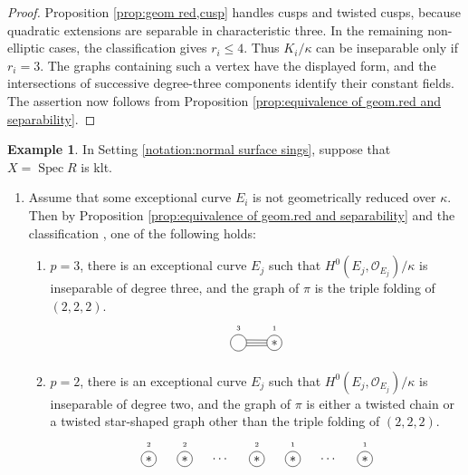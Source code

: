 \documentclass[12pt]{amsart}
\def\le{\leqslant}
\def\Spec{\operatorname{Spec}}
\newcommand{\sO}{\mathcal{O}}
\theoremstyle{plain}
\theoremstyle{definition}
\newtheorem{eg}[thm]{Example}
\theoremstyle{remark}
\newtheorem{defn and notation}[thm]{Definition and Notation}
\theoremstyle{plain}
\numberwithin{equation}{thm}
\begin{document}
\begin{proof}
Proposition \ref{prop:geom red,cusp} handles cusps and twisted cusps, because quadratic extensions are separable in characteristic three.
In the remaining non-elliptic cases, the classification gives $r_i\le4$.
Thus $K_i/\kappa$ can be inseparable only if $r_i=3$.
The graphs containing such a vertex have the displayed form, and the intersections of successive degree-three components identify their constant fields.
The assertion now follows from Proposition \ref{prop:equivalence of geom.red and separability}.
\end{proof}

\begin{eg}\label{eg:geom reducedness of exc div2}
    In Setting \ref{notation:normal surface sings}, suppose that $X=\Spec R$ is klt.
    \begin{enumerate}[label=\textup{(\arabic*)}]
    \item Assume that some exceptional curve $E_i$ is not geometrically reduced over $\kappa$.
    Then by Proposition \ref{prop:equivalence of geom.red and separability} and the classification \cite[Figure 1]{Sato23}, one of the following holds:
    \begin{enumerate}[label=\textup{(\alph*)}]
    \item $p=3$, there is an exceptional curve $E_j$ such that $H^0(E_j, \sO_{E_j})/\kappa$ is inseparable of degree three, and the graph of $\pi$ is the triple folding of $(2,2,2)$. 
    \[
    \begin{tikzpicture}
    \node[draw, shape=circle, inner sep=4.5pt] (B1) at (0,-1){};
    \draw[shift={(0,0.4)}] (0,-1) node{\tiny $3$};
    \node[draw, shape=circle, inner sep=1.8pt] (B2) at (1,-1){$*$};
    \draw[shift={(0,0.4)}] (1,-1) node{\tiny $1$};

    \draw (B1.20)--(B2.160);
    \draw (B1)--(B2);
    \draw (B1.-20)--(B2.200);
    \end{tikzpicture}
    \]
        
    \item $p=2$, there is an exceptional curve $E_j$ such that $H^0(E_j, \sO_{E_j})/\kappa$ is inseparable of degree two, and the graph of $\pi$ is either a twisted chain or a twisted star-shaped graph other than the triple folding of $(2,2,2)$.
    \[
\begin{tikzpicture}
\node[draw, shape=circle, inner sep=1.8pt] (A1) at (0,0){$*$};
\draw[shift={(0,0.4)}] (0,0) node{\tiny $2$};
\node[draw, shape=circle, inner sep=1.8pt] (A2) at (1,0){$*$};
\draw[shift={(0,0.4)}] (1,0) node{\tiny $2$};
\draw node (ADot) at (2,0){$\cdots$};
\node[draw, shape=circle, inner sep=1.8pt] (A3) at (3,0){$*$};
\draw[shift={(0,0.4)}] (3,0) node{\tiny $2$};
\node[draw, shape=circle, inner sep=1.8pt] (A4) at (4,0){$*$};
\draw[shift={(0,0.4)}] (4,0) node{\tiny $1$};
\draw node (ADot2) at (5,0){$\cdots$};
\node[draw, shape=circle, inner sep=1.8pt] (A5) at (6,0){$*$};
\draw[shift={(0,0.4)}] (6,0) node{\tiny $1$};


\end{tikzpicture}\]
\end{enumerate}
\end{enumerate}
\end{eg}
\end{document}
